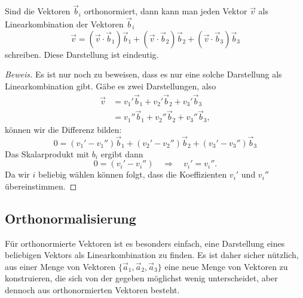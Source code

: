 \begin{satz}
Sind die Vektoren $\vec b_i$ orthonormiert, dann kann man jeden
Vektor $\vec v$ als Linearkombination der Vektoren $\vec b_i$
\[
\vec v=
(\vec v\cdot\vec b_1)\vec b_1
+
(\vec v\cdot\vec b_2)\vec b_2
+
(\vec v\cdot\vec b_3)\vec b_3
\]
schreiben.
Diese Darstellung ist eindeutig.
\end{satz}

\begin{proof}[Beweis]
Es ist nur noch zu beweisen, dass es nur eine solche Darstellung als
Linearkombination gibt.
Gäbe es zwei Darstellungen, also
\begin{align*}
\vec v
&=
v_1'\vec b_1+
v_2'\vec b_2+
v_3'\vec b_3\\
&=
v_1''\vec b_1+
v_2''\vec b_2+
v_3''\vec b_3,
\end{align*}
können wir die Differenz bilden:
\[
0=
(v_1'-v_1'')\vec b_1
+
(v_2'-v_2'')\vec b_2
+
(v_3'-v_3'')\vec b_3
\]
Das Skalarprodukt mit $b_i$ ergibt dann
\[
0=(v_i'-v_i'')\quad\Rightarrow\quad v_i'=v_i''.
\]
Da wir $i$ beliebig wählen können folgt, dass die
Koeffizienten $v_i'$ und $v_i''$ übereinstimmen.
\end{proof}



\subsection{Orthonormalisierung}
Für orthonormierte Vektoren ist es besonders einfach, eine Darstellung
eines beliebigen Vektors als Linearkombination zu finden.
Es ist daher sicher nützlich, aus einer Menge von Vektoren
$\{\vec a_1,\vec a_2,\vec a_3\}$
eine neue Menge von Vektoren zu konstruieren, die sich von der gegeben
möglichst wenig
unterscheidet, aber dennoch aus orthonormierten Vektoren besteht.

